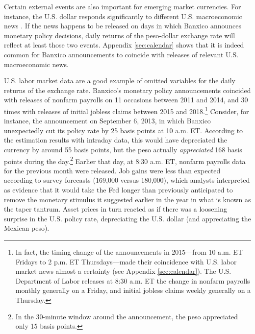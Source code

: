 \documentclass[a4paper,12pt]{article} 		%
\begin{document}
Certain external events are also important for emerging market currencies. For instance, the U.S. dollar responds significantly to different U.S. macroeconomic news \parencite{ABDV:2003,FRWW:2007}. If the news happens to be released on days in which Banxico announces monetary policy decisions, daily returns of the peso-dollar exchange rate will reflect at least those two events. Appendix \ref{sec:calendar} shows that it is indeed common for Banxico announcements to coincide with releases of relevant U.S. macroeconomic news.

U.S. labor market data are a good example of omitted variables for the daily returns of the exchange rate. Banxico's monetary policy announcements coincided with releases of nonfarm payrolls on 11 occasions between 2011 and 2014, and 30 times with releases of initial jobless claims between 2015 and 2018.\footnote{In fact, the timing change of the announcements in 2015---from 10 a.m. ET Fridays to 2 p.m. ET Thursdays---made their coincidence with U.S. labor market news almost a certainty (see Appendix \ref{sec:calendar}). The U.S. Department of Labor releases at 8:30 a.m. ET the change in nonfarm payrolls monthly generally on a Friday, and initial jobless claims weekly generally on a Thursday.} 
Consider, for instance, the announcement on September 6, 2013, in which Banxico unexpectedly cut its policy rate by 25 basis points at 10 a.m. ET. According to the estimation results with intraday data, this would have depreciated the currency by around 55 basis points, but the peso actually \textit{appreciated} 168 basis points during the day.\footnote{ In the 30-minute window around the announcement, the peso appreciated only 15 basis points.} Earlier that day, at 8:30 a.m. ET, nonfarm payrolls data for the previous month were released. Job gains were less than expected according to survey forecasts (169,000 versus 180,000), which analysts interpreted as evidence that it would take the Fed longer than previously anticipated to remove the monetary stimulus it suggested earlier in the year in what is known as the taper tantrum. Asset prices in turn reacted as if there was a loosening surprise in the U.S. policy rate, depreciating the U.S. dollar (and appreciating the Mexican peso). 
\end{document}
